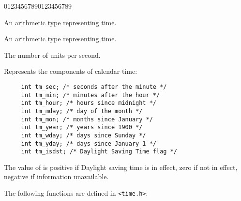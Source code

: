 \begin{Ventry2}{01234567890123456789 }


\item[clock\_t]
\label{item:clockt} 

An arithmetic type representing time.

\item[time\_t]
\label{item:timet}

     An arithmetic type representing time.

\item[CLOCKS\_PER\_SEC]
\label{item:CLOCKSPERSEC}

     The number of  units per second.

\item[struct tm]
\label{item:struct tm}  Represents the components of calendar time:
\begin{verbatim}
     int tm_sec; /* seconds after the minute */
     int tm_min; /* minutes after the hour */
     int tm_hour; /* hours since midnight */
     int tm_mday; /* day of the month */
     int tm_mon; /* months since January */
     int tm_year; /* years since 1900 */
     int tm_wday; /* days since Sunday */
     int tm_yday; /* days since January 1 */
     int tm_isdst; /* Daylight Saving Time flag */
\end{verbatim}

The value of  is positive if Daylight saving time is in effect, zero if
          not in effect, negative if information unavailable.

\end{Ventry2}

The following functions are defined in \verb+<time.h>+:


